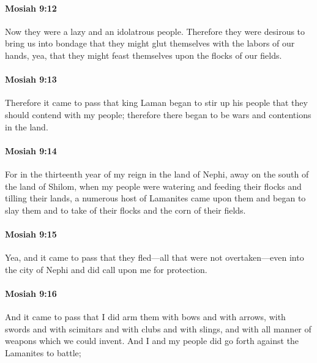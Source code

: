 		\paragraph{Mosiah 9:12} %
			\label{MOSIAH-9-12}

			Now they were a lazy and an idolatrous people.
			Therefore they were desirous to bring us into bondage
			that they might glut themselves with the labors of our hands,
			yea, that they might feast themselves upon the flocks of our fields.

		\paragraph{Mosiah 9:13} %
			\label{MOSIAH-9-13}

			Therefore it came to pass that king Laman began to stir up his people
			that they should contend with my people;
			therefore there began to be wars and contentions in the land.

		\paragraph{Mosiah 9:14} %
			\label{MOSIAH-9-14}

			For in the thirteenth year of my reign
			in the land of Nephi, away on the south of the land of Shilom,
			when my people were watering and feeding their flocks and tilling their lands,
			a numerous host of Lamanites came upon them and began to slay them
			and to take of their flocks and the corn of their fields.

		\paragraph{Mosiah 9:15} %
			\label{MOSIAH-9-15}

			Yea, and it came to pass that
			they fled---all that were not overtaken---even into the city of Nephi
			and did call upon me for protection.

		\paragraph{Mosiah 9:16} %
			\label{MOSIAH-9-16}

			And it came to pass that I did arm them with bows and with arrows,
			with swords and with scimitars and with clubs and with slings,
			and with all manner of weapons which we could invent.
			And I and my people did go forth against the Lamanites to battle;


